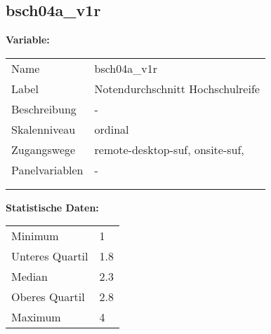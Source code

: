 	
	
	\subsection{bsch04a\_v1r}
	\label{subSection:bsch04a_v1r}

	\noindent\textbf{Variable:}\\
		\begin{tabular}{lL{11.3cm}}
			\label{tableVariable:bsch04a_v1r}
			Name & bsch04a\_v1r \\
			Label & Notendurchschnitt Hochschulreife \\
			Beschreibung & - \\
			Skalenniveau & ordinal \\
			Zugangswege &
				remote-desktop-suf,
				onsite-suf,
 \\
			Panelvariablen & -
			 \\
			 \\
 \\
		\end{tabular}



		\vspace*{1 cm}
		\noindent\textbf{Statistische Daten:}\\
			\begin{tabular}{ll}
				\label{tableStatistics:bsch04a_v1r}
					Minimum & 1 \\
					Unteres Quartil & 1.8 \\
					Median & 2.3 \\
					Oberes Quartil & 2.8 \\
					Maximum & 4 \\
			\end{tabular}



